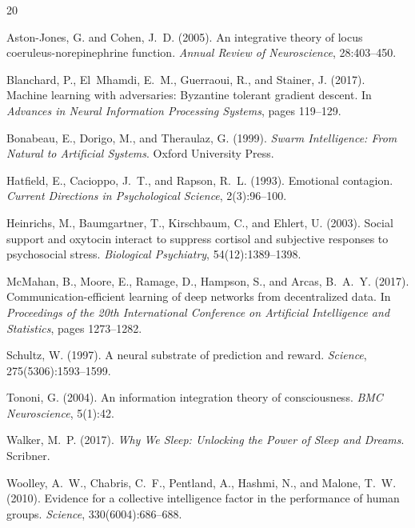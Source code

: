 \documentclass[11pt,a4paper]{article}
\begin{document}

\begin{thebibliography}{20}

Aston-Jones, G. and Cohen, J.~D. (2005).
\newblock An integrative theory of locus coeruleus-norepinephrine function.
\newblock \emph{Annual Review of Neuroscience}, 28:403--450.

Blanchard, P., El~Mhamdi, E.~M., Guerraoui, R., and Stainer, J. (2017).
\newblock Machine learning with adversaries: Byzantine tolerant gradient descent.
\newblock In \emph{Advances in Neural Information Processing Systems}, pages 119--129.

Bonabeau, E., Dorigo, M., and Theraulaz, G. (1999).
\newblock \emph{Swarm Intelligence: From Natural to Artificial Systems}.
\newblock Oxford University Press.

Hatfield, E., Cacioppo, J.~T., and Rapson, R.~L. (1993).
\newblock Emotional contagion.
\newblock \emph{Current Directions in Psychological Science}, 2(3):96--100.

Heinrichs, M., Baumgartner, T., Kirschbaum, C., and Ehlert, U. (2003).
\newblock Social support and oxytocin interact to suppress cortisol and subjective responses to psychosocial stress.
\newblock \emph{Biological Psychiatry}, 54(12):1389--1398.

McMahan, B., Moore, E., Ramage, D., Hampson, S., and Arcas, B.~A.~Y. (2017).
\newblock Communication-efficient learning of deep networks from decentralized data.
\newblock In \emph{Proceedings of the 20th International Conference on Artificial Intelligence and Statistics}, pages 1273--1282.

Schultz, W. (1997).
\newblock A neural substrate of prediction and reward.
\newblock \emph{Science}, 275(5306):1593--1599.

Tononi, G. (2004).
\newblock An information integration theory of consciousness.
\newblock \emph{BMC Neuroscience}, 5(1):42.

Walker, M.~P. (2017).
\newblock \emph{Why We Sleep: Unlocking the Power of Sleep and Dreams}.
\newblock Scribner.

Woolley, A.~W., Chabris, C.~F., Pentland, A., Hashmi, N., and Malone, T.~W. (2010).
\newblock Evidence for a collective intelligence factor in the performance of human groups.
\newblock \emph{Science}, 330(6004):686--688.

\end{thebibliography}
\end{document}
